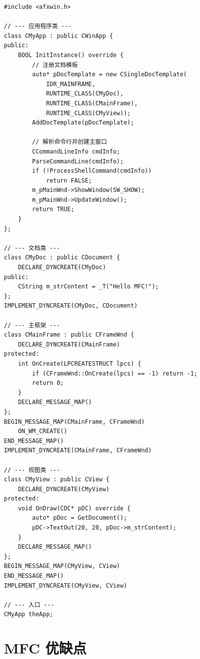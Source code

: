 \documentclass[12pt,a4paper,fontset=fandol]{ctexbook}
\newcommand{\cpplabel}{%
  \tcbox[on line,colback=cppheadbg,colframe=cppheadbg,
    boxrule=0pt,arc=1pt,left=2pt,right=2pt,top=1pt,bottom=1pt,
    colupper=white,fontupper=\scriptsize\bfseries]{C++}}
\begin{document}
\cpplabel
\begin{lstlisting}[style=cppstyle]
#include <afxwin.h>

// --- 应用程序类 ---
class CMyApp : public CWinApp {
public:
    BOOL InitInstance() override {
        // 注册文档模板
        auto* pDocTemplate = new CSingleDocTemplate(
            IDR_MAINFRAME,
            RUNTIME_CLASS(CMyDoc),
            RUNTIME_CLASS(CMainFrame),
            RUNTIME_CLASS(CMyView));
        AddDocTemplate(pDocTemplate);

        // 解析命令行并创建主窗口
        CCommandLineInfo cmdInfo;
        ParseCommandLine(cmdInfo);
        if (!ProcessShellCommand(cmdInfo))
            return FALSE;
        m_pMainWnd->ShowWindow(SW_SHOW);
        m_pMainWnd->UpdateWindow();
        return TRUE;
    }
};

// --- 文档类 ---
class CMyDoc : public CDocument {
    DECLARE_DYNCREATE(CMyDoc)
public:
    CString m_strContent = _T("Hello MFC!");
};
IMPLEMENT_DYNCREATE(CMyDoc, CDocument)

// --- 主框架 ---
class CMainFrame : public CFrameWnd {
    DECLARE_DYNCREATE(CMainFrame)
protected:
    int OnCreate(LPCREATESTRUCT lpcs) {
        if (CFrameWnd::OnCreate(lpcs) == -1) return -1;
        return 0;
    }
    DECLARE_MESSAGE_MAP()
};
BEGIN_MESSAGE_MAP(CMainFrame, CFrameWnd)
    ON_WM_CREATE()
END_MESSAGE_MAP()
IMPLEMENT_DYNCREATE(CMainFrame, CFrameWnd)

// --- 视图类 ---
class CMyView : public CView {
    DECLARE_DYNCREATE(CMyView)
protected:
    void OnDraw(CDC* pDC) override {
        auto* pDoc = GetDocument();
        pDC->TextOut(20, 20, pDoc->m_strContent);
    }
    DECLARE_MESSAGE_MAP()
};
BEGIN_MESSAGE_MAP(CMyView, CView)
END_MESSAGE_MAP()
IMPLEMENT_DYNCREATE(CMyView, CView)

// --- 入口 ---
CMyApp theApp;
\end{lstlisting}

\section{MFC 优缺点}
\end{document}
